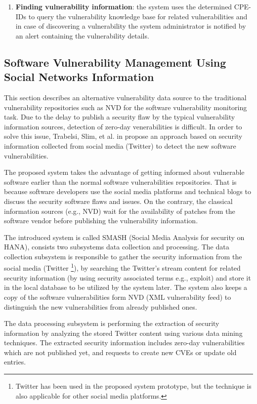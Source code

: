 \documentclass{llncs}
\begin{document}
\begin{enumerate}
   \item \textbf{Finding vulnerability information}: the system uses the determined CPE-IDs to query the vulnerability knowledge base for related vulnerabilities and in case of discovering a vulnerability  the system administrator is notified by an alert containing the vulnerability details.      
   
 
 \end{enumerate}

\subsection{Software	Vulnerability	Management	Using	Social	Networks	Information	}

\par This section describes an alternative vulnerability data source to the traditional vulnerability repositories such as NVD for the software vulnerability monitoring task. Due to the  delay to publish a security flaw  by the typical vulnerability information sources,  detection of zero-day venerabilities is difficult.  In order to solve this issue,  Trabelsi, Slim, et al. in \cite{paper2} propose an approach based on security information collected from social media (Twitter) to detect the new software vulnerabilities.


\par
The proposed system takes the advantage of getting informed about vulnerable software earlier than the normal software vulnerabilities repositories. That is because software developers use the social media platforms and technical blogs to discuss the security software flaws and issues. On the contrary, the classical information sources (e.g., NVD) wait for the availability of patches from the software vendor before publishing the vulnerability information.

\par The introduced system is called SMASH (Social Media Analysis for security on HANA), consists two subsystems data collection and processing. The data collection subsystem is responsible to gather the security information from the social media (Twitter \footnote{Twitter has been used in the proposed system prototype, but the technique is also applicable for other social media platforms.}), by searching the Twitter's stream content for related security information (by using security associated terms e.g., exploit) and store it in the local database to be utilized by the system later. The system also keeps a copy of the software vulnerabilities form NVD (XML vulnerability feed) to distinguish the new  vulnerabilities from already published ones.
\par
The data processing subsystem is performing the extraction of security information by analyzing the stored Twitter content using various data mining techniques. The extracted security information 
includes zero-day vulnerabilities which are not published yet, and requests to create new CVEs or update old entries.
\end{document}
